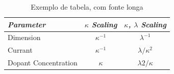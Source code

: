 
\begin{table}[hb]
\renewcommand{\baselinestretch}{1.4}%
\small
   \centering
   \caption{Exemplo de tabela, com fonte longa}
	\begin{center}
	   \begin{tabular}{lcc}
	       \hline%
	       \itshape Parameter&
	           \itshape $\kappa$ Scaling&
	           \itshape $\kappa$, $\lambda$ Scaling\\*
	       \hline
	       Dimension&
	           $\kappa^{-1}$&
	           $\lambda^{-1}$\\*
	       Currant&
	           $\kappa^{-1}$&
	               $\lambda/\kappa^{2}$\\*
	       Dopant Concentration&
	           $\kappa$&
	           $\lambda2/\kappa$\\*
	       \hline
	   \end{tabular}
	\end{center}
    \renewcommand{\baselinestretch}{1.0}
\end{table}


